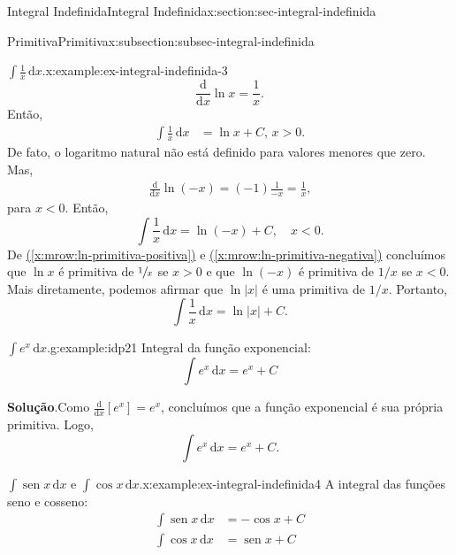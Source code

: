 \documentclass[oneside,10pt,]{article}
\newcommand{\blocktitlefont}{\relax}
\newcommand{\xreffont}{\relax}
\numberwithin{equation}{section}
\newcommand{\dd}{\mathrm{d}}
\newcommand{\integral}[2]{\displaystyle\int {#1}\,\dd {#2}}
\DeclareMathOperator{\sin}{sen}
\newcommand{\lt}{<}
\newcommand{\gt}{>}
\newcommand{\amp}{&}
\begin{document}
\begin{sectionptx}{Integral Indefinida}{}{Integral Indefinida}{}{}{x:section:sec-integral-indefinida}
\begin{subsectionptx}{Primitiva}{}{Primitiva}{}{}{x:subsection:subsec-integral-indefinida}
\begin{example}{\(\integral{\frac{1}{x}}{x}\).}{x:example:ex-integral-indefinida-3}
\begin{equation*}
\frac{\dd}{\dd x}\ln{x}= \frac{1}{x}\text{.}
\end{equation*}
Então,%
\begin{align}
\integral{\frac{1}{x}}{x} \amp= \ln{x} + C, \, x \gt 0  \text{.}\tag{\(\star\)}\label{x:mrow:ln-primitiva-positiva}
\end{align}
De fato, o logaritmo natural não está definido para valores menores que zero. Mas,%
\begin{gather}
\frac{\dd}{\dd x}\ln{(-x)} = (-1)\frac{1}{-x}=\frac{1}{x}  \text{,}\tag{\(\star\star\)}\label{x:mrow:ln-primitiva-negativa}
\end{gather}
para \(x \lt 0\). Então,%
\begin{equation*}
\integral{\frac{1}{x}}{x}= \ln{(-x)} + C, \quad x \lt 0\text{.}
\end{equation*}
De \hyperref[x:mrow:ln-primitiva-positiva]{({\xreffont\ref{x:mrow:ln-primitiva-positiva}})} e \hyperref[x:mrow:ln-primitiva-negativa]{({\xreffont\ref{x:mrow:ln-primitiva-negativa}})} concluímos que \(\ln{x}\) é primitiva de  \(\sfrac{1}{x}\) se \(x\gt 0\) e que  \(\ln{(-x)}\) é primitiva de \(1/x\) se \(x\lt 0\). Mais diretamente, podemos afirmar que \(\ln{|x|}\) é uma primitiva de \(1/x\). Portanto,%
\begin{equation*}
\integral{\frac{1}{x}}{x} = \ln{|x|} + C\text{.}
\end{equation*}
%
\end{example}
\begin{example}{\(\integral{e^x}{x}\).}{g:example:idp21}%
Integral da função exponencial:%
\begin{equation*}
\integral{e^x}{x}=e^x + C 
\end{equation*}
%
\par\smallskip%
\noindent\textbf{\blocktitlefont Solução}.\hypertarget{g:solution:idp22}{}\quad{}Como \(\frac{\dd }{\dd x}[e^x]=e^x\), concluímos que a função exponencial é sua própria primitiva. Logo,%
\begin{equation*}
\integral{e^x}{x}= e^x + C.
\end{equation*}
%
\end{example}
\begin{example}{\(\integral{\sin{x}}{x}\) e \(\integral{\cos{x}}{x}\).}{x:example:ex-integral-indefinida4}%
A integral das funções seno e cosseno:%
\begin{align*}
\integral{\sin{x}}{x}\amp =-\cos{x}+C\\
\integral{\cos{x}}{x} \amp=\sin{x}+C 

\end{align*}
\end{example}
\end{subsectionptx}
\end{sectionptx}
\end{document}
